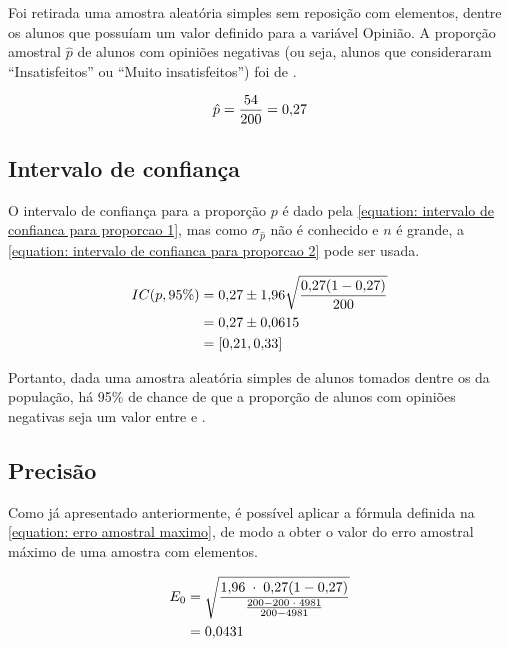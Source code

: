 

	Foi retirada uma amostra aleatória simples sem reposição com \CINCOn
	elementos, dentre os \CINCON alunos que possuíam um valor definido para
	a variável Opinião.  A proporção amostral $\hat{p}$ de alunos com
	opiniões negativas (ou seja, alunos que consideraram ``Insatisfeitos''
	ou ``Muito insatisfeitos'') foi de \CINCOpAmostral.

	\begin{align*} 
		\hat{p}  &= {\frac{54}{200}} = \num{0.27} \nonumber \\
	\end{align*}

\subsection{Intervalo de confiança}

	O intervalo de confiança para a proporção $p$ é dado pela
    \autoref{equation: intervalo de confianca para proporcao 1}, mas como $\sigma_{\hat{p}}$ 
    não é conhecido e $n$ é grande, a 
    \autoref{equation: intervalo de confianca para proporcao 2} pode ser usada.

	\begin{align} 
		IC(p, 95\%) 
					&= \num{0.27} \pm \num{1.96} \sqrt{\frac{\num{0.27} (1- \num{0.27})}{200}} \nonumber \\
					&= \num{0.27} \pm \num{0.0615} \nonumber \\
					\label{eq:cinco-a-result}
					&= [\num{0.21}, \num{0.33}]
	\end{align}

	Portanto, dada uma amostra aleatória simples de \CINCOn alunos tomados
	dentre os \CINCON da população, há 95\% de chance de que a proporção de
	alunos com opiniões negativas seja um valor entre \CINCOAICinf e
	\CINCOAICsup.

\subsection{Precisão}

	Como já apresentado anteriormente, é possível aplicar a fórmula
    definida na \autoref{equation: erro amostral maximo}, de modo a obter
    o valor do erro amostral máximo de uma amostra com \CINCOn elementos.

	\begin{align}
		\label{eq:cinco-b-e0-calc}
		E_0 &= \sqrt{\frac{\num{1.96} \;\cdot\; \num{0.27} (1 - \num{0.27}) }{\frac{200 - 200 \;\cdot\; 4981}{200 - 4981}}} \\
			&= \num{0.0431} \nonumber
	\end{align}

